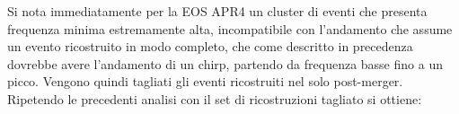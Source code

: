 Si nota immediatamente per la EOS APR4 un cluster di eventi che presenta frequenza minima estremamente alta, incompatibile con l'andamento che assume un evento ricostruito in modo completo, che come descritto in precedenza dovrebbe avere l'andamento di un chirp, partendo da frequenza basse fino a un picco. Vengono quindi tagliati gli eventi ricostruiti nel solo post-merger. 
Ripetendo le precedenti analisi con il set di ricostruzioni tagliato si ottiene:
\begin{figure}[H]
	\vspace{-5pt}
	\centering
	\\
	\vspace{-10pt}
	 \\

\end{figure}

